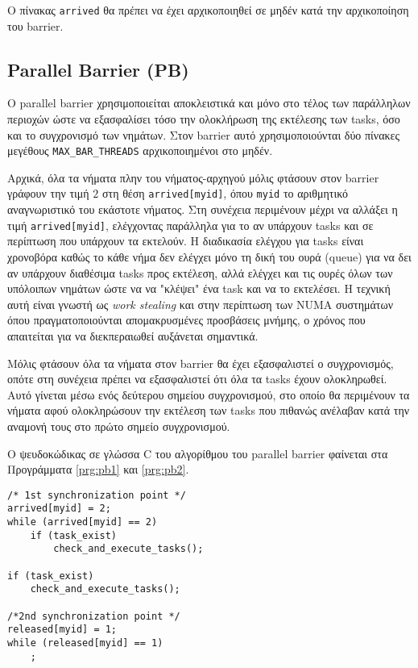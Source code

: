 Ο πίνακας \texttt{arrived} θα πρέπει να έχει αρχικοποιηθεί σε μηδέν κατά την αρχικοποίηση του barrier.


\subsection{Parallel Barrier (PB)}
Ο parallel barrier χρησιμοποιείται αποκλειστικά και μόνο στο τέλος των παράλληλων περιοχών ώστε να εξασφαλίσει τόσο την ολοκλήρωση της εκτέλεσης των tasks, όσο και το συγχρονισμό των νημάτων. Στον barrier αυτό χρησιμοποιούνται δύο πίνακες μεγέθους \texttt{MAX\_BAR\_THREADS} αρχικοποιημένοι στο μηδέν.

Αρχικά, όλα τα νήματα πλην του νήματος-αρχηγού μόλις φτάσουν στον barrier γράφουν την τιμή $2$ στη θέση \texttt{arrived[myid]}, όπου \texttt{myid} το αριθμητικό αναγνωριστικό του εκάστοτε νήματος. Στη συνέχεια περιμένουν μέχρι να αλλάξει η τιμή \texttt{arrived[myid]}, ελέγχοντας παράλληλα για το αν υπάρχουν tasks και σε περίπτωση που υπάρχουν τα εκτελούν. Η διαδικασία ελέγχου για tasks είναι χρονοβόρα καθώς το κάθε νήμα δεν ελέγχει μόνο τη δική του ουρά (queue) για να δει αν υπάρχουν διαθέσιμα tasks προς εκτέλεση, αλλά ελέγχει και τις ουρές όλων των υπόλοιπων νημάτων ώστε να να "κλέψει" ένα task και να το εκτελέσει. Η τεχνική αυτή είναι γνωστή ως \textit{work stealing} και στην περίπτωση των NUMA συστημάτων όπου πραγματοποιούνται απομακρυσμένες προσβάσεις μνήμης, ο χρόνος που απαιτείται για να διεκπεραιωθεί αυξάνεται σημαντικά.

Μόλις φτάσουν όλα τα νήματα στον barrier θα έχει εξασφαλιστεί ο συγχρονισμός, οπότε στη συνέχεια πρέπει να εξασφαλιστεί ότι όλα τα tasks έχουν ολοκληρωθεί. Αυτό γίνεται μέσω ενός δεύτερου σημείου συγχρονισμού, στο οποίο θα περιμένουν τα νήματα αφού ολοκληρώσουν την εκτέλεση των tasks που πιθανώς ανέλαβαν κατά την αναμονή τους στο πρώτο σημείο συγχρονισμού.

Ο ψευδοκώδικας σε γλώσσα C του αλγορίθμου του parallel barrier φαίνεται στα Προγράμματα \ref{prg:pb1} και \ref{prg:pb2}.

\begin{lstlisting}[label=prg:pb1, caption=Parallel barrier για όλα τα νήματα πλην του νήματος-αρχηγού.]
/* 1st synchronization point */
arrived[myid] = 2;
while (arrived[myid] == 2)
    if (task_exist)
        check_and_execute_tasks();
    
if (task_exist)
    check_and_execute_tasks();
    
/*2nd synchronization point */
released[myid] = 1;
while (released[myid] == 1)
    ;
\end{lstlisting}


